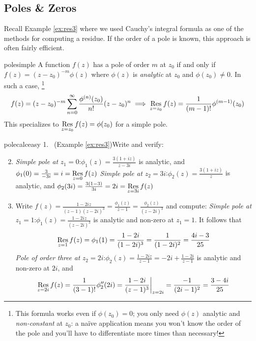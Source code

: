 \subsection{Poles \& Zeros}

Recall Example \ref{ex:res3} where we used Cauchy's integral formula as one of the methods for computing a residue. If the order of a pole is known, this approach is often fairly efficient.

\begin{thm}{}{polesimple}
A function $f(z)$ has a pole of order $m$ at $z_0$ if and only if $f(z)=(z-z_0)^{-m}\phi(z)$ where $\phi(z)$ is \emph{analytic} at $z_0$ and $\phi(z_0)\neq 0$. In such a case,
\footnote{This formula works even if $\phi(z_0)=0$; you only need $\phi(z)$ analytic and \emph{non-constant} at $z_0$: a naïve application means you won't know the order of the pole and you'll have to differentiate more times than necessary!}
\[f(z)=(z-z_0)^{-m}\sum_{n=0}^\infty \frac{\phi^{(n)}(z_0)}{n!}(z-z_0)^n \implies \operatorname*{Res}_{z=z_0}f(z)=\frac 1{(m-1)!}\phi^{(m-1)}(z_0)\]
This specializes to $\operatorname*{Res}\limits_{z=z_0}f(z)=\phi(z_0)$ for a simple pole.
\end{thm}

\begin{examples}{}{polecalceasy}
\hangindent\leftmargini
\textup{1.} \ (Example \ref{ex:res3})\quad Write  and verify:
\begin{enumerate}\setcounter{enumi}{1}
  \item[]\emph{Simple pole at $z_1=0$}:\quad $\phi_1(z)=\frac{3(1+iz)}{z-3i}$ is analytic, and $\phi_1(0)=\frac 3{-3i}=i=\operatorname*{Res}\limits_{z=0}f(z)$\smallbreak
\emph{Simple pole at $z_2=3i$}:\quad $\phi_2(z)=\frac{3(1+iz)}{z}$ is analytic, and $\phi_2(3i)=\frac{3(1-3)}{3i}=2i=\operatorname*{Res}\limits_{z=3i}f(z)$
  
  \item Write {$\displaystyle f(z)=\frac{1-2iz}{(z-1)(z-2i)^3}=\frac{\phi_1(z)}{z-1} =\frac{\phi_2(z)}{(z-2i)^{3}}$} and compute:\smallbreak
	\emph{Simple pole at $z_1=1$}:\quad $\phi_1(z)=\frac{1-2iz}{(z-2i)^3}$ is analytic and non-zero at $z_1=1$. It follows that
    \[\operatorname*{Res}_{z=1}f(z)=\phi_1(1)=\frac{1-2i}{(1-2i)^3}=\frac 1{(1-2i)^2}=\frac{4i-3}{25}\]
  \emph{Pole of order three at $z_2=2i$}:\quad $\phi_2(z)=\frac{1-2iz}{z-1}=-2i+\frac{1-2i}{z-1}$ is analytic and non-zero at $2i$, and
    \[\operatorname*{Res}_{z=2i}f(z)=\frac 1{(3-1)!}\phi_2''(2i)=\frac{1-2i}{(z-1)^3}\bigg|_{z=2i}=\frac{-1}{(2i-1)^2}=\frac{3-4i}{25}\]
\end{enumerate}
\end{examples}

